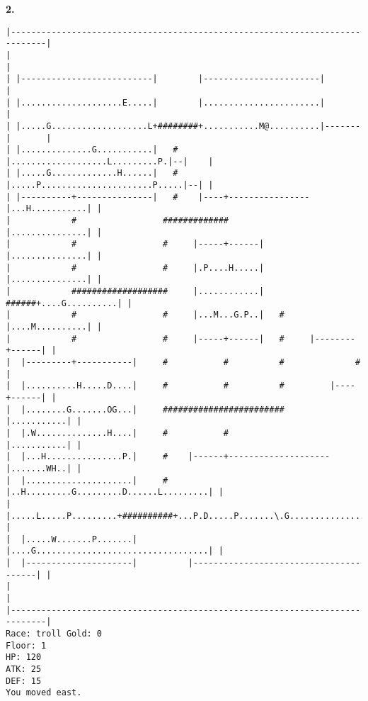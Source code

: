 \documentclass[11pt]{article}
\theoremstyle{plain}
\begin{document}
\newpage
\textbf{2. }
\begin{Verbatim}[fontsize=\scriptsize]
|-----------------------------------------------------------------------------|
|                                                                             |
| |--------------------------|        |-----------------------|               |
| |....................E.....|        |.......................|               |
| |.....G...................L+########+...........M@..........|-------|       |
| |..............G...........|   #    |...................L.........P.|--|    |
| |.....G.............H......|   #    |.....P......................P.....|--| |
| |----------+---------------|   #    |----+----------------|...H...........| |
|            #                 #############                |...............| |
|            #                 #     |-----+------|         |...............| |
|            #                 #     |.P....H.....|         |...............| |
|            ###################     |............|   ######+....G..........| |
|            #                 #     |...M...G.P..|   #     |....M..........| |
|            #                 #     |-----+------|   #     |--------+------| |
|  |---------+-----------|     #           #          #              #        |
|  |..........H.....D....|     #           #          #         |----+------| |
|  |........G.......OG...|     ########################         |...........| |
|  |.W..............H....|     #           #                    |...........| |
|  |...H...............P.|     #    |------+--------------------|.......WH..| |
|  |.....................|     #    |..H.........G.........D......L.........| |
|  |.....L.....P.........+##########+...P.D.....P.......\.G.................| |
|  |.....W.......P.......|          |....G..................................| |
|  |---------------------|          |---------------------------------------| |
|                                                                             |
|-----------------------------------------------------------------------------|
Race: troll Gold: 0                                                    Floor: 1
HP: 120
ATK: 25
DEF: 15
You moved east. 
\end{Verbatim}
\end{document}
